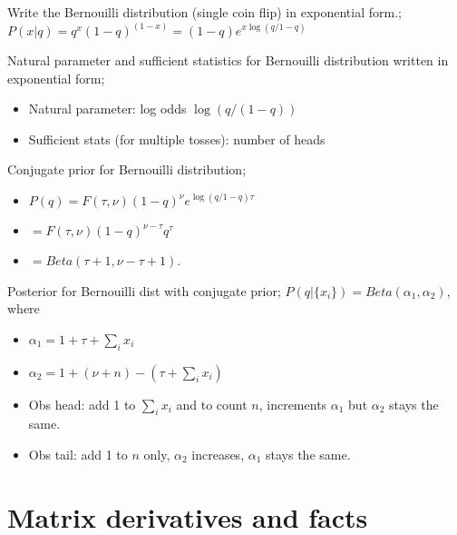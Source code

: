 \documentclass{article}
\begin{document}
Write the Bernouilli distribution (single coin flip) in exponential form.; $P(x|q) = q^x(1-q)^{(1-x)} = (1-q)e^{x\log(q/1-q)}$

Natural parameter and sufficient statistics for Bernouilli distribution written in exponential form; \begin{itemize}
	\item Natural parameter: log odds $\log (q/(1-q))$
	\item Sufficient stats (for multiple tosses): number of heads
\end{itemize}

Conjugate prior for Bernouilli distribution; \begin{itemize}
	\item $P(q)=F(\tau, \nu)(1-q)^{\nu}e^{\log(q/1-q)\tau}$
	\item $=F(\tau, \nu)(1-q)^{\nu-\tau}q^{\tau}$ 
	\item $= Beta(\tau+1, \nu-\tau+1)$.
\end{itemize}

Posterior for Bernouilli dist with conjugate prior; $P(q|\{x_i\}) = Beta(\alpha_1, \alpha_2)$, where 
\begin{itemize}
	\item $\alpha_1 = 1+\tau+\sum_i x_i$ \item $\alpha_2 = 1+(\nu+n) - (\tau+\sum_i x_i)$
	\item Obs head: add 1 to $\sum_i x_i$ and to count $n$, increments $\alpha_1$ but $\alpha_2$ stays the same.
	\item Obs tail: add 1 to $n$ only, $\alpha_2$ increases, $\alpha_1$ stays the same.
\end{itemize}

\section{Matrix derivatives and facts}
\end{document}
